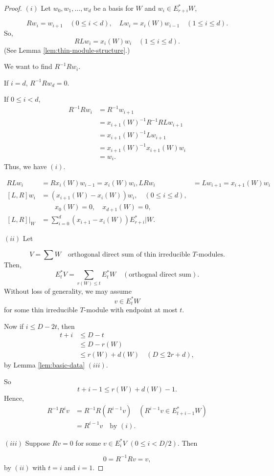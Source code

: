 \documentclass[
]{book}
\theoremstyle{definition}
\theoremstyle{definition}
\theoremstyle{definition}
\theoremstyle{definition}
\theoremstyle{remark}
\begin{document}
\begin{proof}
\leavevmode

\((i)\) Let \(w_0, w_1, \ldots, w_d\) be a basis for \(W\) and \(w_i\in E^*_{r+i}W\),

\[Rw_i = w_{i+1} \quad (0\leq i< d), \quad Lw_i = x_i(W)w_{i-1}\quad (1\leq i\leq d).\]
So,
\[RLw_i = x_i(W)w_i \quad (1\leq i\leq d).\]
(See Lemma \ref{lem:thin-module-structure}.)

We want to find \(R^{-1}Rw_i\).

If \(i=d\), \(R^{-1}Rw_d = 0\).

If \(0\leq i<d\),
\begin{align}
R^{-1}Rw_i & = R^{-1}w_{i+1}\\
& = x_{i+1}(W)^{-1}R^{-1}RLw_{i+1}\\
& = x_{i+1}(W)^{-1}Lw_{i+1}\\
& = x_{i+1}(W)^{-1}x_{i+1}(W)w_i\\
& = w_i.
\end{align}
Thus, we have \((i)\).

\begin{align}
RLw_i & = Rx_i(W)w_{i-1} = x_i(W)w_i,
LRw_i & = Lw_{i+1} = x_{i+1}(W)w_i\\
[L,R]w_i & = (x_{i+1}(W)-x_i(W))w_i, \quad (0\leq i\leq d),\\
& \qquad x_0(W) = 0, \quad x_{d+1}(W) = 0, \\
[L,R]|_W & = \sum_{i=0}^d(x_{i+1}-x_i(W))E^*_{r+i}|W.
\end{align}

\((ii)\) Let

\[V = \sum W \quad \text{orthogonal direct sum of thin irreducible $T$-modules.}\]
Then,
\[E^*_tV = \sum_{r(W)\leq t}E^*_tW\quad (\text{orthognal direct sum}).\]
Without loss of generality, we may assume
\[v\in E^*_t W\]
for some thin irreducible \(T\)-module with endpoint at most \(t\).

Now if \(i\leq D-2t\), then
\begin{align}
t+i & \leq D-t \\
& \leq D-r(W)\\
& \leq r(W) + d(W) \quad (D\leq 2r+d),
\end{align}
by Lemma \ref{lem:basic-data} \((iii)\).

So
\[t+i-1\leq r(W) + d(W) -1.\]
Hence,
\begin{align}
R^{-1}R^iv & = R^{-1}R(R^{i-1}v) \quad (R^{i-1}v\in E^*_{t+i-1}W)\\
& = R^{i-1}v \quad \text{by $(i)$.}
\end{align}

\((iii)\) Suppose \(Rv = 0\) for some \(v\in E^*_iV\) \((0\leq i< D/2)\). Then

\[0 = R^{-1}Rv = v,\]
by \((ii)\) with \(t = i\) and \(i=1\).

\end{proof}
\end{document}

